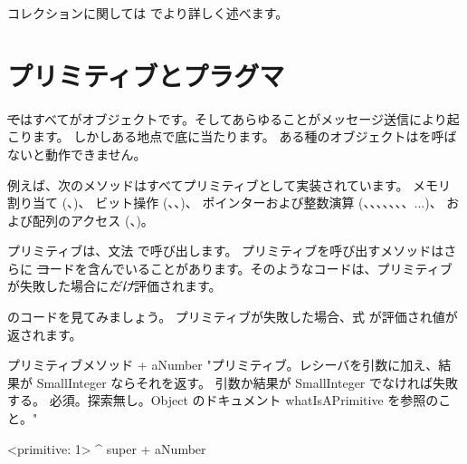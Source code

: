 \documentclass[a4paper,10pt,twoside]{book}
\begin{document}
コレクションに関しては  でより詳しく述べます。

\section{プリミティブとプラグマ}

\st ではすべてがオブジェクトです。そしてあらゆることがメッセージ送信により起こります。
しかしある地点で底に当たります。
ある種のオブジェクトはを呼ばないと動作できません。

例えば、次のメソッドはすべてプリミティブとして実装されています。
メモリ割り当て (、)、
ビット操作 (、、)、
ポインターおよび整数演算 (\ct{+}、\ct{-}、\ct{<}、\ct{>}、\ct{*}、\ct{/ }、\ct{=}、\ct{==}...)、
および配列のアクセス (、)。

プリミティブは、文法  で呼び出します。
プリミティブを呼び出すメソッドはさらに \st コードを含んでいることがあります。そのようなコードは、プリミティブが失敗した場合に\emph{だけ}評価されます。

のコードを見てみましょう。
プリミティブが失敗した場合、式  が評価され値が返されます。

\begin{method}[primitive]{プリミティブメソッド}
+ aNumber 
  "プリミティブ。レシーバを引数に加え、結果が SmallInteger ならそれを返す。
  引数か結果が SmallInteger でなければ失敗する。
  必須。探索無し。Object のドキュメント whatIsAPrimitive を参照のこと。"

  <primitive: 1>
  ^ super + aNumber
\end{method}

\end{document}
